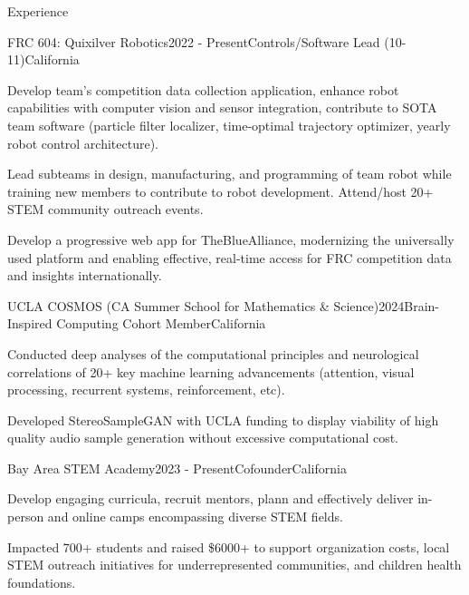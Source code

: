 \documentclass[
  10pt, %
]{resume} %
\begin{document}
\sloppy


\begin{rSection}{Experience}


  \begin{rSubsection}{FRC 604: Quixilver Robotics}{2022 - Present}{Controls/Software Lead (10-11)}{California}
    
    \item Develop team's competition data collection application, enhance robot capabilities with computer vision and sensor integration, contribute to SOTA team software (particle filter localizer, time-optimal trajectory optimizer, yearly robot control architecture).
    
    \item Lead subteams in design, manufacturing, and programming of team robot while training new members to contribute to robot development. Attend/host 20+ STEM community outreach events.
    
    \item Develop a progressive web app for TheBlueAlliance, modernizing the universally used platform and enabling effective, real-time access for FRC competition data and insights internationally.
    
  \end{rSubsection}
        
  \begin{rSubsection}{UCLA COSMOS (CA Summer School for Mathematics \& Science)}{2024}{Brain-Inspired Computing Cohort Member}{California}
    
    \item Conducted deep analyses of the computational principles and neurological correlations of 20+ key machine learning advancements (attention, visual processing, recurrent systems, reinforcement, etc).
    
    \item Developed StereoSampleGAN with UCLA funding to display viability of high quality audio sample generation without excessive computational cost.
    
  \end{rSubsection}
        
  \begin{rSubsection}{Bay Area STEM Academy}{2023 - Present}{Cofounder}{California}
    
    \item Develop engaging curricula, recruit mentors, plann and effectively deliver in-person and online camps encompassing diverse STEM fields.
    
    \item Impacted 700+ students and raised \$6000+ to support organization costs, local STEM outreach initiatives for underrepresented communities, and children health foundations.
    
  \end{rSubsection}
        
	
\end{rSection}
\end{document}
